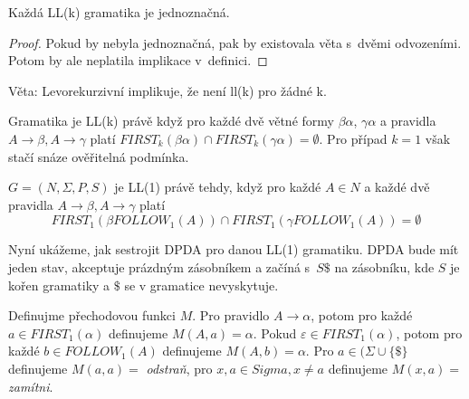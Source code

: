 \begin{theorem}
    Každá LL(k) gramatika je jednoznačná.
\end{theorem}

\begin{proof}
Pokud by nebyla jednoznačná, pak by existovala věta s~dvěmi odvozeními.
Potom by ale neplatila implikace v~definici.
\end{proof}

Věta: Levorekurzivní implikuje, že není ll(k) pro žádné k.

Gramatika je LL(k) právě když pro každé dvě větné formy $\beta \alpha$,
$\gamma \alpha$ a pravidla $A \to \beta, A \to \gamma$
platí $FIRST_k(\beta \alpha) \cap FIRST_k(\gamma \alpha) = \emptyset$.
Pro případ $k = 1$ však stačí snáze ověřitelná podmínka.

\begin{theorem}
    $G = (N, \Sigma, P, S)$ je LL(1) právě tehdy, když
    pro každé $A \in N$
    a každé dvě pravidla $A \to \beta, A \to \gamma$
    platí
    \[
        FIRST_1(\beta FOLLOW_1(A)) \cap FIRST_1(\gamma FOLLOW_1(A)) = \emptyset
    \]
\end{theorem}

Nyní ukážeme, jak sestrojit DPDA pro danou LL(1) gramatiku.
DPDA bude mít jeden stav, akceptuje prázdným zásobníkem
a začíná s~$S\$$ na zásobníku, kde $S$ je kořen
gramatiky a $\$$ se v gramatice nevyskytuje.

Definujme přechodovou funkci $M$.
Pro pravidlo $A \to \alpha$, potom pro každé $a \in FIRST_1(\alpha)$
definujeme $M(A, a) = \alpha$. Pokud $\varepsilon \in FIRST_1(\alpha)$,
potom pro každé $b \in FOLLOW_1(A)$ definujeme $M(A,b) = \alpha$.
Pro $a \in (\Sigma \cup \{ \$ \}$ definujeme $M(a,a) =$ {\em odstraň},
pro $x, a \in Sigma, x \neq a$ definujeme $M(x, a) =$ {\em zamítni}.


